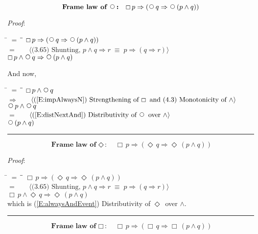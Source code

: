 \documentclass[12pt, fleqn, leqno]{article}
\newcommand{\lgap}{2pt}                             %
\newcommand{\mymathindent}{24pt}                    %
\newcommand{\equivs}{\ensuremath{\;\equiv\;}}       %
\newcommand{\impl}{\ensuremath{\Rightarrow}}        %
\newcommand{\Next}{\;\,\text{\raisebox{3.5pt}{\circle{6}}}}
\newcommand{\Event}{\Diamond\,}
\newcommand{\Always}{\Box\,}
\newcommand{\myqed}{\rule[-.23ex]{1.2ex}{2.0ex}}
\newcommand{\myqedtab}{\hspace{384pt}}              %
\newcommand{\Gll} {\langle}                         %
\newcommand{\Ggg} {\rangle}                         %
\newcommand{\Hint}[1]     {\ \ \ $\Gll              \mbox{#1} \Ggg$ }   %
\begin{document}
%
%
\begin{equation}\label{E:framelawnext}
\textbf{Frame law of $\Next$:}\quad \Always p \impl (\Next q \impl \Next (p \land q))
\end{equation}

\emph{Proof}:
\begin{tabbing}
\hspace{\mymathindent} \= $= \;$ \= \myqedtab \= \kill
  \> \>   $\Always p \impl (\Next q \impl \Next (p \land q))$\\[\lgap]
  \> $=$  \>  \Hint{(3.65) Shunting, $p\land q\impl r\equivs p\impl (q\impl r)$}\\[\lgap]
  \> \>   $\Always p \land \Next q \impl \Next (p \land q)$
\end{tabbing}
And now,
\begin{tabbing}
\hspace{\mymathindent} \= $= \;$ \= \myqedtab \= \kill
  \> \>   $\Always p \land \Next q $\\[\lgap]
  \> $\impl$  \>  \Hint{(\ref{E:impAlwaysN}) Strengthening of $\Always$ and (4.3) Monotonicity of $\land$}\\[\lgap]
  \> \>   $\Next p \land \Next q $\\[\lgap]
  \> $=$  \>  \Hint{(\ref{E:distNextAnd}) Distributivity of $\Next$ over $\land$}\\[\lgap]
  \> \>   $\Next (p \land q)$\quad \myqed
\end{tabbing}
\begin{equation}\label{E:framelawEvent}
\textbf{Frame law of $\Event$:}\quad \Always p \impl (\Event q \impl \Event (p \land q))
\end{equation}

\emph{Proof}:
\begin{tabbing}
\hspace{\mymathindent} \= $= \;$ \= \myqedtab \= \kill
  \> \>   $\Always p \impl (\Event q \impl \Event (p \land q))$\\[\lgap]
  \> $=$  \>  \Hint{(3.65) Shunting, $p\land q\impl r\equivs p\impl (q\impl r)$}\\[\lgap]
  \> \>   $\Always p \land \Event q \impl \Event (p \land q)$\\[\lgap]
  \> which is (\ref{E:alwaysAndEvent}) Distributivity of $\Event$ over $\land$. \quad \myqed
\end{tabbing}
\begin{equation}\label{E:framelawAlways}
\textbf{Frame law of $\Always$:}\quad \Always p \impl (\Always q \impl \Always (p \land q))
\end{equation}
\end{document}
